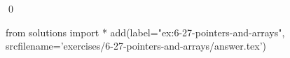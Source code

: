 
\begin{ex}
  \label{ex:6-27-pointers-and-arrays}
  
  \qed
\end{ex}
\begin{python0}
from solutions import *
add(label="ex:6-27-pointers-and-arrays",
    srcfilename='exercises/6-27-pointers-and-arrays/answer.tex')
\end{python0}
